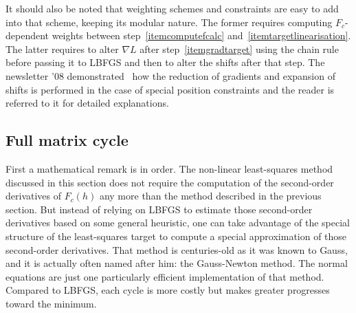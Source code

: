 \documentclass[12pt]{article}
\begin{document}
It should also be noted that weighting schemes and constraints are easy to add into that scheme, keeping its modular nature. The former requires computing $F_c$-dependent weights between step~\ref{itemcomputefcalc} and~\ref{itemtargetlinearisation}. The latter requires to alter $\nabla L$ after step~\ref{itemgradtarget} using the chain rule before passing it to LBFGS and then to alter the shifts after that step. The \cctbx newsletter '08 demonstrated~\cite{Bourhis:2008} how the reduction of gradients and expansion of shifts is performed in the case of special position constraints and the reader is referred to it for detailed explanations.
 
 \subsection{Full matrix cycle}
 
 First a mathematical remark is in order. The non-linear least-squares method discussed in this section does not require the computation of the second-order derivatives of $F_c(h)$ any more than the method described in the previous section. But instead of relying on LBFGS to estimate those second-order derivatives based on some general heuristic, one can take advantage of the special structure of the least-squares target to compute a special approximation of those second-order derivatives. That method is centuries-old as it was known to Gauss, and it is actually often named after him: the Gauss-Newton method. The normal equations are just one particularly efficient implementation of that method. Compared to LBFGS, each cycle is more costly but makes greater progresses toward the minimum.
 
\end{document}
